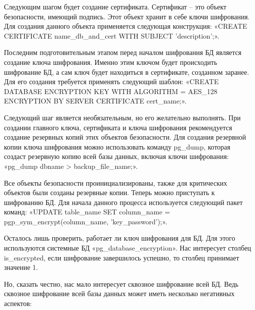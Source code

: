 Следующим шагом будет создание сертификата. Сертификат – это объект безопасности, имеющий подпись. Этот объект хранит в себе ключи шифрования. Для создания данного объекта применяется следующая конструкция: «CREATE CERTIFICATE name\_db\_and\_cert WITH SUBJECT 'description';».

Последним подготовительным этапом перед началом шифрования БД является создание ключа шифрования. Именно этим ключом будет происходить шифрование БД, а сам ключ будет находиться в сертификате, созданном заранее. Для его создания требуется применять следующий шаблон: «CREATE DATABASE ENCRYPTION KEY WITH ALGORITHM = AES\_128 ENCRYPTION BY SERVER CERTIFICATE cert\_name;».

Следующий шаг является необязательным, но его желательно выполнять. При создании главного ключа, сертификата и ключа шифрования рекомендуется создание резервных копий этих объектов безопасности. Для создания резервной копии ключа шифрования можно использовать команду pg\_dump, которая создаст резервную копию всей базы данных, включая ключи шифрования: «pg\_dump dbname > backup\_file\_name;».

Все объекты безопасности проинициализированы, также для критических объектов были созданы резервные копии. Теперь можно приступать к шифрованию БД. Для начала данного процесса используется следующий пакет команд: «UPDATE table\_name SET column\_name = pgp\_sym\_encrypt(column\_name, 'key\_password');».

Осталось лишь проверить, работает ли ключ шифрования для БД. Для этого используются системные БД «pg\_database\_encryption». Нас интересует столбец is\_encrypted, если шифрование завершилось успешно, то столбец принимает значение 1.

Но, сказать честно, нас мало интересует сквозное шифрование всей БД. Ведь сквозное шифрование всей базы данных может иметь несколько негативных аспектов:

